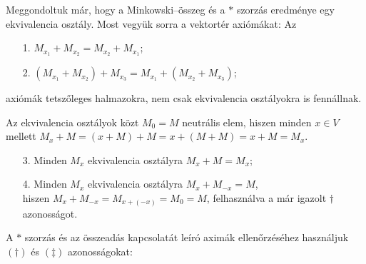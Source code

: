 \documentclass[9pt, showtrims]{memoir}
\makeatletter
\renewenvironment{proof}[1][\proofname]
    {\par\pushQED{\qed}%
    \normalfont \topsep6\p@\@plus6\p@\relax
    \trivlist
    \item[\hskip\labelsep
        \itshape
    #1\@addpunct{:}]\ignorespaces}
    {\popQED\endtrivlist\@endpefalse}
\theoremstyle{plain}
\theoremstyle{remark}
\theoremstyle{definition}
\makeatother
\begin{document}
\begin{proof}
    Meggondoltuk már, hogy a Minkowski--összeg és a $\ast$ szorzás eredménye egy ekvivalencia osztály.
    Most vegyük sorra a vektortér axiómákat:
    Az
    \begin{enumerate}
        \item[1.] $M_{x_1}+M_{x_{2}}=M_{x_2}+M_{x_1}$;
        \item[2.] $\left( M_{x_1}+M_{x_2} \right)+M_{x_3}=
            M_{x_1}+\left( M_{x_2}+M_{x_3} \right)$;
    \end{enumerate}
    axiómák tetszőleges halmazokra, nem csak ekvivalencia osztályokra is fennállnak.
    
    Az ekvivalencia osztályok közt $M_0=M$ neutrális elem,
    hiszen minden $x\in V$ mellett $M_x+M=\left( x+M \right)+M=x+\left( M+M \right)=x+M=M_x$.
    \begin{enumerate}
        \item[3.] Minden $M_x$ ekvivalencia osztályra $M_x+M=M_x$;
        \item[4.] Minden $M_x$ ekvivalencia osztályra $M_x+M_{-x}=M$,\\
            hiszen 
            $M_x+M_{-x}=M_{x+\left( -x \right)}=M_0=M$, 
            felhasználva a már igazolt $\dag$ azonosságot.
    \end{enumerate}
    A $\ast$ szorzás és az összeadás kapcsolatát leíró aximák ellenőrzéséhez használjuk
    $(\dag)$ és $(\ddag)$ azonosságokat:
\end{proof}
\end{document}
